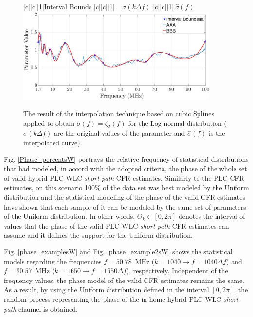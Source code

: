 \begin{figure}[h]
	\centering
	[c][1]{Interval Bounds}
	[c][1]{${~~~~~\sigma}(k \Delta f)$}
	[c][1]{$~\hat{\sigma}(f)$}
	\includegraphics[width=0.9\textwidth]{images/Beta_fitsW.eps}
	\caption{The result of the interpolation technique based on cubic Splines applied to obtain $\sigma(f)=\zeta_2(f)$ for the Log-normal distribution (${\sigma}(k \Delta f)$ are the original values of the parameter and $\hat{\sigma}(f)$ is the interpolated curve).}
	\label{Fit_betasW}
\end{figure}

Fig. \ref{Phase_percentsW} portrays the relative frequency of statistical distributions that had modeled, in accord with the adopted criteria, the phase of the whole set of valid  hybrid \ac{PLC}-\ac{WLC} \textit{short-path} \ac{CFR} estimates. Similarly to the \ac{PLC} \ac{CFR} estimates, on this scenario 100\% of the data set was best modeled by the Uniform distribution and the statistical modeling of the phase of the valid \ac{CFR} estimates have shown that each sample of it can be modeled by the same set of parameters of the Uniform distribution. In other words, $\Theta_k \in [0, 2\pi]$ denotes the interval of values that the phase of the valid \ac{PLC}-\ac{WLC} \textit{short-path} \ac{CFR} estimates can assume and it defines the support for the Uniform distribution. 

Fig. \ref{phase_examplesW} and Fig. \ref{phase_example2sW} shows the statistical models regarding the frequencies $f=50.78$~MHz ($k=1040 \rightarrow f = 1040\Delta f$) and $f=80.57$~MHz ($k=1650 \rightarrow f = 1650\Delta f$), respectively. Independent of the frequency values, the phase model of the valid \ac{CFR} estimates remains the same. As a result, by using the Uniform distribution defined in the interval $[0, 2\pi]$, the random process representing the phase of the in-home hybrid \ac{PLC}-\ac{WLC} \textit{short-path} channel is obtained.


